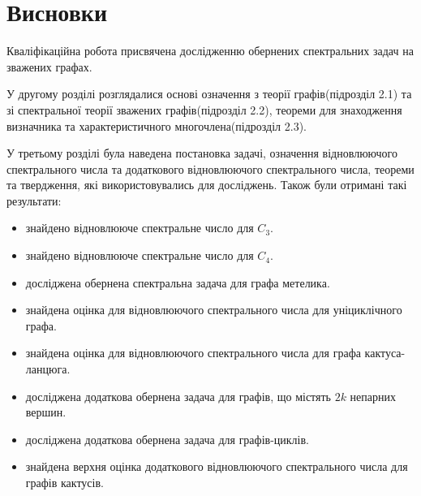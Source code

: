 \setcounter{secnumdepth}{0}
\section{Висновки}
Кваліфікаційна робота присвячена дослідженню обернених спектральних задач на зважених графах.

У другому розділі розглядалися основі означення з теорії графів(підрозділ 2.1) та зі спектральної теорії зважених графів(підрозділ 2.2), теореми для знаходження визначника та характеристичного многочлена(підрозділ 2.3).

У третьому розділі була наведена постановка задачі, означення відновлюючого спектрального числа та додаткового відновлюючого спектрального числа, теореми та твердження, які використовувались для досліджень. Також були отримані такі результати:
\begin{itemize}
\item знайдено відновлююче спектральне число для $C_3$.
\item знайдено відновлююче спектральне число для $C_4$.
\item досліджена обернена спектральна задача для графа метелика.
\item знайдена оцінка для відновлюючого спектрального числа для уніциклічного графа.
\item знайдена оцінка для відновлюючого спектрального числа для графа кактуса-ланцюга.
\item досліджена додаткова обернена задача для графів, що містять $2k$ непарних вершин.
\item досліджена додаткова обернена задача для графів-циклів.
\item знайдена верхня оцінка додаткового відновлюючого спектрального числа для графів кактусів.
\end{itemize}

